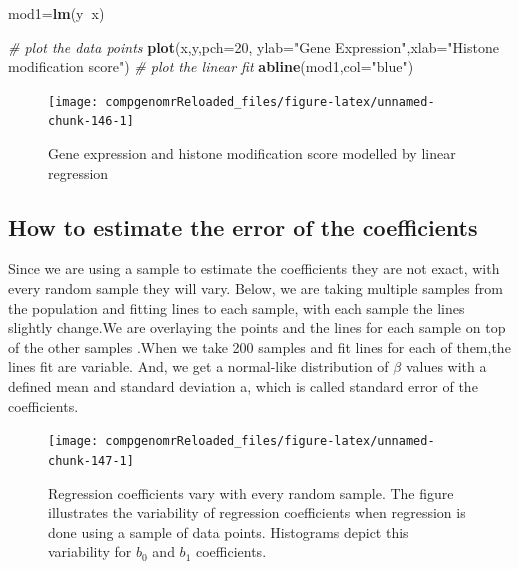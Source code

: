 \documentclass[12pt,]{krantz}
\newenvironment{Shaded}{\begin{snugshade}}{\end{snugshade}}
\newcommand{\CommentTok}[1]{\textcolor[rgb]{0.56,0.35,0.01}{\textit{#1}}}
\newcommand{\DataTypeTok}[1]{\textcolor[rgb]{0.13,0.29,0.53}{#1}}
\newcommand{\DecValTok}[1]{\textcolor[rgb]{0.00,0.00,0.81}{#1}}
\newcommand{\KeywordTok}[1]{\textcolor[rgb]{0.13,0.29,0.53}{\textbf{#1}}}
\newcommand{\NormalTok}[1]{#1}
\newcommand{\OperatorTok}[1]{\textcolor[rgb]{0.81,0.36,0.00}{\textbf{#1}}}
\newcommand{\StringTok}[1]{\textcolor[rgb]{0.31,0.60,0.02}{#1}}
\begin{document}
\begin{Shaded}
\begin{Highlighting}[]
\NormalTok{mod1=}\KeywordTok{lm}\NormalTok{(y}\OperatorTok{~}\NormalTok{x)}

\CommentTok{# plot the data points}
\KeywordTok{plot}\NormalTok{(x,y,}\DataTypeTok{pch=}\DecValTok{20}\NormalTok{,}
     \DataTypeTok{ylab=}\StringTok{"Gene Expression"}\NormalTok{,}\DataTypeTok{xlab=}\StringTok{"Histone modification score"}\NormalTok{)}
\CommentTok{# plot the linear fit}
\KeywordTok{abline}\NormalTok{(mod1,}\DataTypeTok{col=}\StringTok{"blue"}\NormalTok{)}
\end{Highlighting}
\end{Shaded}

\begin{figure}

{\centering \texttt{[image: compgenomrReloaded\_files/figure-latex/unnamed-chunk-146-1]} 

}

\caption{Gene expression and histone modification score modelled by linear regression}\label{fig:unnamed-chunk-146}
\end{figure}

\hypertarget{how-to-estimate-the-error-of-the-coefficients}{%
\subsection{How to estimate the error of the coefficients}\label{how-to-estimate-the-error-of-the-coefficients}}

Since we are using a sample to estimate the coefficients they are
not exact, with every random sample they will vary. Below, we
are taking multiple samples from the population and fitting lines to each
sample, with each sample the lines slightly change.We are overlaying the
points and the lines for each sample on top of the other samples
.When we take 200 samples and fit lines for each of them,the lines fit are
variable. And,
we get a normal-like distribution of \(\beta\) values with a defined mean
and standard deviation a, which is called standard error of the
coefficients.

\begin{figure}

{\centering \texttt{[image: compgenomrReloaded\_files/figure-latex/unnamed-chunk-147-1]} 

}

\caption{Regression coefficients vary with every random sample. The figure illustrates the variability of regression coefficients when regression is done using a sample of data points. Histograms depict this variability for $b_0$ and $b_1$ coefficients.}\label{fig:unnamed-chunk-147}
\end{figure}
\end{document}

